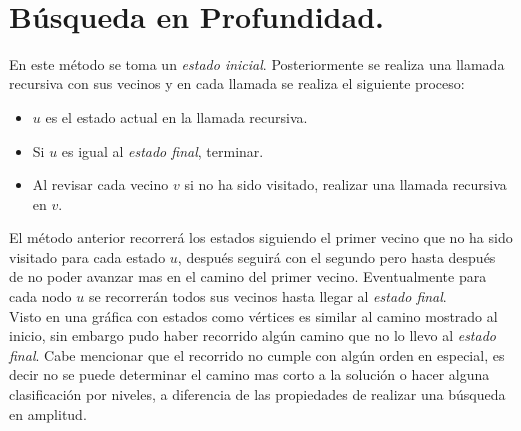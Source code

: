 \documentclass[12pt]{article}
\def \L {2.}
\begin{document}
	\\
	\pagebreak
	\section{Búsqueda en Profundidad.}
	En este método se toma un \textit{estado inicial}. Posteriormente se realiza una llamada recursiva con sus vecinos y en cada llamada se realiza el siguiente proceso:
	\begin{itemize}
		\item $u$ es el estado actual en la llamada recursiva.
		\item Si $u$ es igual al \textit{estado final}, terminar.
		\item Al revisar cada vecino $v$ si no ha sido visitado, realizar una llamada recursiva en $v$.
	\end{itemize}
	El método anterior recorrerá los estados siguiendo el primer vecino que no ha sido visitado para cada estado $u$, después seguirá con el segundo pero hasta después de no poder avanzar mas en el camino del primer vecino. Eventualmente para cada nodo $u$ se recorrerán todos sus vecinos hasta llegar al \textit{estado final}.\\
	Visto en una gráfica con estados como vértices es similar al camino mostrado al inicio, sin embargo pudo haber recorrido algún camino que no lo llevo al \textit{estado final}. Cabe mencionar que el recorrido no cumple con algún orden en especial, es decir no se puede determinar el camino mas corto a la solución o hacer alguna clasificación por niveles, a diferencia de las propiedades de realizar una búsqueda en amplitud.\\
	\pagebreak
\end{document}
